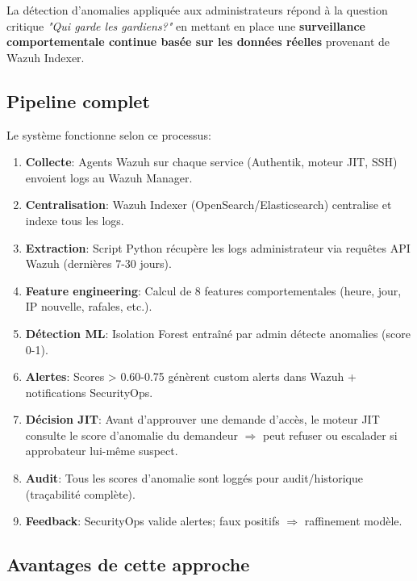 La détection d'anomalies appliquée aux administrateurs répond à la question critique \textit{"Qui garde les gardiens?"} 
en mettant en place une \textbf{surveillance comportementale continue basée sur les données réelles} provenant de Wazuh Indexer.

\subsection{Pipeline complet}

Le système fonctionne selon ce processus:

\begin{enumerate}
	\item \textbf{Collecte}: Agents Wazuh sur chaque service (Authentik, moteur JIT, SSH) envoient logs au Wazuh Manager.
	
	\item \textbf{Centralisation}: Wazuh Indexer (OpenSearch/Elasticsearch) centralise et indexe tous les logs.
	
	\item \textbf{Extraction}: Script Python récupère les logs administrateur via requêtes API Wazuh (dernières 7-30 jours).
	
	\item \textbf{Feature engineering}: Calcul de 8 features comportementales (heure, jour, IP nouvelle, rafales, etc.).
	
	\item \textbf{Détection ML}: Isolation Forest entraîné par admin détecte anomalies (score 0-1).
	
	\item \textbf{Alertes}: Scores > 0.60-0.75 génèrent custom alerts dans Wazuh + notifications SecurityOps.
	
	\item \textbf{Décision JIT}: Avant d'approuver une demande d'accès, le moteur JIT consulte le score d'anomalie 
	du demandeur $\Rightarrow$ peut refuser ou escalader si approbateur lui-même suspect.
	
	\item \textbf{Audit}: Tous les scores d'anomalie sont loggés pour audit/historique (traçabilité complète).
	
	\item \textbf{Feedback}: SecurityOps valide alertes; faux positifs $\Rightarrow$ raffinement modèle.
\end{enumerate}

\subsection{Avantages de cette approche}

